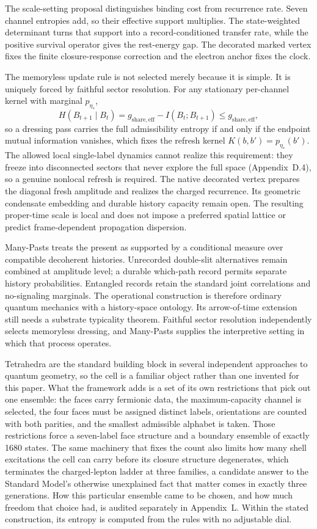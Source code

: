 \documentclass[11pt]{article}
\begin{document}
The scale-setting proposal distinguishes binding cost from recurrence rate. Seven channel entropies add, so their effective support multiplies. The state-weighted determinant turns that support into a record-conditioned transfer rate, while the positive survival operator gives the rest-energy gap. The decorated marked vertex fixes the finite closure-response correction and the electron anchor fixes the clock.

The memoryless update rule is not selected merely because it is simple. It is uniquely forced by faithful sector resolution. For any stationary per-channel kernel with marginal $p_{\eta_*}$,
\[
H(B_{t+1}\mid B_t)=g_{\mathrm{share,eff}}-I(B_t;B_{t+1})\le g_{\mathrm{share,eff}},
\]
so a dressing pass carries the full admissibility entropy if and only if the endpoint mutual information vanishes, which fixes the refresh kernel $K(b,b')=p_{\eta_*}(b')$. The allowed local single-label dynamics cannot realize this requirement: they freeze into disconnected sectors that never explore the full space (Appendix~D.4), so a genuine nonlocal refresh is required. The native decorated vertex prepares the diagonal fresh amplitude and realizes the charged recurrence. Its geometric condensate embedding and durable history capacity remain open. The resulting proper-time scale is local and does not impose a preferred spatial lattice or predict frame-dependent propagation dispersion.

Many-Pasts treats the present as supported by a conditional measure over compatible decoherent histories. Unrecorded double-slit alternatives remain combined at amplitude level; a durable which-path record permits separate history probabilities. Entangled records retain the standard joint correlations and no-signaling marginals. The operational construction is therefore ordinary quantum mechanics with a history-space ontology. Its arrow-of-time extension still needs a substrate typicality theorem. Faithful sector resolution independently selects memoryless dressing, and Many-Pasts supplies the interpretive setting in which that process operates.

Tetrahedra are the standard building block in several independent approaches to quantum geometry, so the cell is a familiar object rather than one invented for this paper. What the framework adds is a set of its own restrictions that pick out one ensemble: the faces carry fermionic data, the maximum-capacity channel is selected, the four faces must be assigned distinct labels, orientations are counted with both parities, and the smallest admissible alphabet is taken. Those restrictions force a seven-label face structure and a boundary ensemble of exactly 1680 states. The same machinery that fixes the count also limits how many shell excitations the cell can carry before its closure structure degenerates, which terminates the charged-lepton ladder at three families, a candidate answer to the Standard Model's otherwise unexplained fact that matter comes in exactly three generations. How this particular ensemble came to be chosen, and how much freedom that choice had, is audited separately in Appendix~L. Within the stated construction, its entropy is computed from the rules with no adjustable dial.
\end{document}
